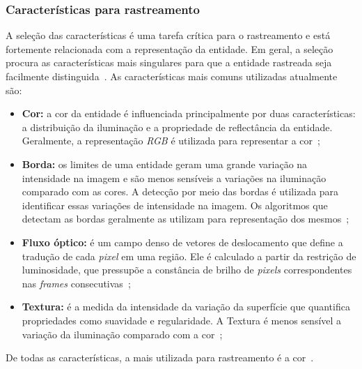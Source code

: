 
\subsubsection{Características para rastreamento}

	A seleção das características é uma tarefa crítica para o rastreamento e está fortemente relacionada com a representação da entidade. Em geral, a seleção procura as características mais singulares para que a entidade rastreada seja facilmente distinguida~\cite{yilmaz}. As características mais comuns utilizadas atualmente são:

	\begin{itemize}
		\item \textbf{Cor:} a cor da entidade é influenciada principalmente por duas características: a distribuição da iluminação e a propriedade de reflectância da entidade. Geralmente, a representação \textit{RGB} é utilizada para representar a cor~\cite{yilmaz};

		\item \textbf{Borda:} os limites de uma entidade geram uma grande variação na intensidade na imagem e são menos sensíveis a variações na iluminação comparado com as cores. A detecção por meio das bordas é utilizada para identificar essas variações de intensidade na imagem. Os algoritmos que detectam as bordas geralmente as utilizam para representação dos mesmos~\cite{yilmaz};

		\item \textbf{Fluxo óptico:} é um campo denso de vetores de deslocamento que define a tradução de cada \textit{pixel} em uma região. Ele é calculado a partir da restrição de luminosidade, que pressupõe a constância de brilho de \textit{pixels} correspondentes nas \textit{frames} consecutivas~\cite{yilmaz, horn};

		\item \textbf{Textura:} é a medida da intensidade da variação da superfície que quantifica propriedades como suavidade e regularidade. A Textura é menos sensível a variação da iluminação comparado com a cor~\cite{yilmaz};

	\end{itemize}

De todas as características, a mais utilizada para rastreamento é a cor~\cite{yilmaz}.


